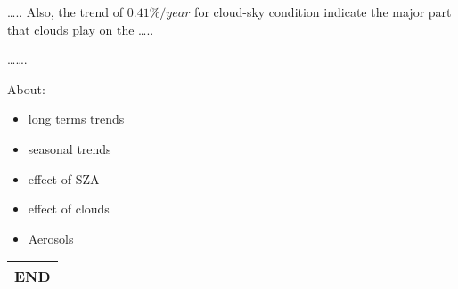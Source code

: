 \documentclass[
  preprint, 3p, authoryear]{article}
\begin{document}
\ldots..
Also, the trend of \(0.41\%/year\) for cloud-sky condition indicate the major part that clouds play on the
\ldots..

\ldots\ldots.

About:

\begin{itemize}
\item
  long terms trends
\item
  seasonal trends
\item
  effect of SZA
\item
  effect of clouds
\item
  Aerosols
\end{itemize}

\begin{longtable}[]{@{}c@{}}
\toprule
\endhead
\textbf{END} \\
\bottomrule
\end{longtable}
\end{document}
